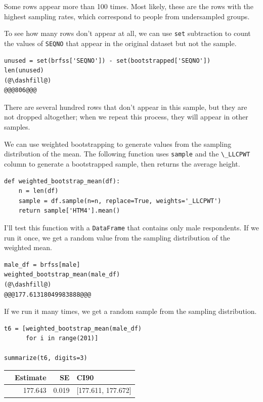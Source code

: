 Some rows appear more than 100 times. Most likely, these are the rows
with the highest sampling rates, which correspond to people from
undersampled groups.

To see how many rows don't appear at all, we can use
\passthrough{\lstinline!set!} subtraction to count the values of
\passthrough{\lstinline!SEQNO!} that appear in the original dataset but
not the sample.

\begin{lstlisting}[]
unused = set(brfss['SEQNO']) - set(bootstrapped['SEQNO'])
len(unused)
(@\dashfill@)
@@@806@@@
\end{lstlisting}

There are several hundred rows that don't appear in this sample, but
they are not dropped altogether; when we repeat this process, they will
appear in other samples.

We can use weighted bootstrapping to generate values from the sampling
distribution of the mean. The following function uses
\passthrough{\lstinline!sample!} and the
\passthrough{\lstinline!\_LLCPWT!} column to generate a bootstrapped
sample, then returns the average height.

\begin{lstlisting}[]
def weighted_bootstrap_mean(df):
    n = len(df)
    sample = df.sample(n=n, replace=True, weights='_LLCPWT')
    return sample['HTM4'].mean()
\end{lstlisting}

I'll test this function with a \passthrough{\lstinline!DataFrame!} that
contains only male respondents. If we run it once, we get a random value
from the sampling distribution of the weighted mean.

\begin{lstlisting}[]
male_df = brfss[male]
weighted_bootstrap_mean(male_df)
(@\dashfill@)
@@@177.61318049983888@@@
\end{lstlisting}

If we run it many times, we get a random sample from the sampling
distribution.

\begin{lstlisting}[]
t6 = [weighted_bootstrap_mean(male_df) 
      for i in range(201)]

summarize(t6, digits=3)
\end{lstlisting}

\begin{tabular}{lrrl}
\midrule
{} &  Estimate &     SE &                CI90 \\
\midrule
{} &   177.643 &  0.019 &  [177.611, 177.672] \\
\midrule
\end{tabular}

